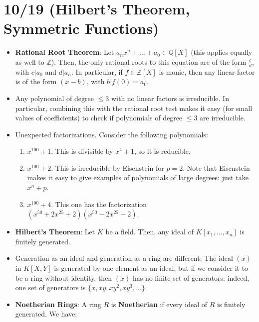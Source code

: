 \documentclass[11pt, oneside]{amsart}   	%
\theoremstyle{definition}
\begin{document}
\section{10/19 (Hilbert's Theorem, Symmetric Functions)}

\begin{itemize}

	\item \textbf{Rational Root Theorem}: Let $a_nx^n + ... + a_0\in \mathbb Q[X]$ (this applies equally as well to $\mathbb Z$). Then, the only rational 
	roots to this equation are of the form $\frac{c}{d}$, with $c | a_0$ and $d | a_n$. In particular, if $f\in\mathbb Z[X]$ is monic, then any linear factor 
	is of the form $(x - b)$, with $b | f(0) = a_0$.
	
	\item Any polynomial of degree $\leq 3$ with no linear factors is irreducible. In particular, combining this with the rational root test makes it easy 
	(for small values of coefficients) to check if polynomials of degree $\leq 3$ are irreducible. 
	
	\item Unexpected factorizations. Consider the following polynomials:
		\begin{enumerate}
			\item $x^{100} + 1$. This is divisible by $x^4 + 1$, so it is reducible.
			\item $x^{100} + 2$. This is irreducible by Eisenstein for $p = 2$. Note that Eisenstein makes it easy to give examples of polynomials of 
			large degrees: just take $x^n + p$.
			\item $x^{100} + 4$. This one has the factorization $(x^{50} + 2x^{25} + 2)(x^{50} - 2x^{25} + 2)$.
		\end{enumerate}
	
	\item \textbf{Hilbert's Theorem}: Let $K$ be a field. Then, any ideal of $K[x_1, ..., x_n]$ is finitely generated.
	
	\item Generation as an ideal and generation as a ring are different: The ideal $(x)$ in $K[X, Y]$ is generated by one element as an ideal, but if we 
	consider it to be a ring without identity, then $(x)$ has no finite set of generators: indeed, one set of generators is $\{x, xy, xy^2, xy^3, ...\}$.
	
	\item \textbf{Noetherian Rings}: A ring $R$ is \textbf{Noetherian} if every ideal of $R$ is finitely generated. We have:
	

\end{itemize}
\end{document}
